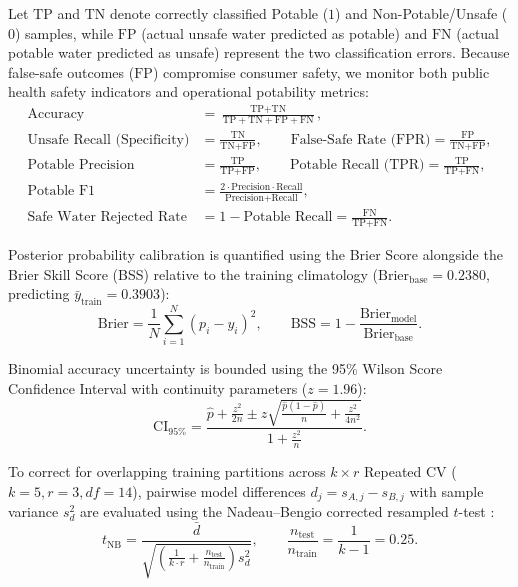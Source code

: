 \documentclass[pdflatex,sn-mathphys-num]{sn-jnl}%
\theoremstyle{thmstyleone}%
\theoremstyle{thmstyletwo}%
\theoremstyle{thmstylethree}%
\begin{document}
Let $\text{TP}$ and $\text{TN}$ denote correctly classified Potable ($1$) and Non-Potable/Unsafe ($0$) samples, while $\text{FP}$ (actual unsafe water predicted as potable) and $\text{FN}$ (actual potable water predicted as unsafe) represent the two classification errors. Because false-safe outcomes ($\text{FP}$) compromise consumer safety, we monitor both public health safety indicators and operational potability metrics:
\begin{align}
\text{Accuracy} &= \frac{\text{TP} + \text{TN}}{\text{TP} + \text{TN} + \text{FP} + \text{FN}}, \label{eq:acc} \\
\text{Unsafe Recall (Specificity)} &= \frac{\text{TN}}{\text{TN} + \text{FP}}, \qquad \text{False-Safe Rate (FPR)} = \frac{\text{FP}}{\text{TN} + \text{FP}}, \label{eq:unsafe_rec} \\
\text{Potable Precision} &= \frac{\text{TP}}{\text{TP} + \text{FP}}, \qquad \text{Potable Recall (TPR)} = \frac{\text{TP}}{\text{TP} + \text{FN}}, \label{eq:potable_prec_rec} \\
\text{Potable F1} &= \frac{2 \cdot \text{Precision} \cdot \text{Recall}}{\text{Precision} + \text{Recall}}, \label{eq:potable_f1} \\
\text{Safe Water Rejected Rate} &= 1 - \text{Potable Recall} = \frac{\text{FN}}{\text{TP} + \text{FN}}. \label{eq:safe_rejected}
\end{align}

Posterior probability calibration is quantified using the Brier Score \cite{brier1950} alongside the Brier Skill Score (BSS) relative to the training climatology ($\text{Brier}_{\text{base}} = 0.2380$, predicting $\bar{y}_{\text{train}} = 0.3903$):
\begin{equation}
\text{Brier} = \frac{1}{N}\sum_{i=1}^{N}(p_i - y_i)^2, \qquad \text{BSS} = 1 - \frac{\text{Brier}_{\text{model}}}{\text{Brier}_{\text{base}}}. \label{eq:brier_bss}
\end{equation}

Binomial accuracy uncertainty is bounded using the 95\% Wilson Score Confidence Interval \cite{wilson1927} with continuity parameters ($z = 1.96$):
\begin{equation}
\text{CI}_{95\%} = \frac{\hat{p} + \frac{z^2}{2n} \pm z\sqrt{\frac{\hat{p}(1-\hat{p})}{n} + \frac{z^2}{4n^2}}}{1 + \frac{z^2}{n}}. \label{eq:wilson_ci}
\end{equation}

To correct for overlapping training partitions across $k \times r$ Repeated CV ($k=5, r=3, df=14$), pairwise model differences $d_j = s_{A,j} - s_{B,j}$ with sample variance $s_d^2$ are evaluated using the Nadeau--Bengio corrected resampled $t$-test \cite{nadeau2003}:
\begin{equation}
t_{\text{NB}} = \frac{\bar{d}}{\sqrt{\left(\frac{1}{k \cdot r} + \frac{n_{\text{test}}}{n_{\text{train}}}\right) s_d^2}}, \qquad \frac{n_{\text{test}}}{n_{\text{train}}} = \frac{1}{k - 1} = 0.25. \label{eq:nadeau_t}
\end{equation}
\end{document}
